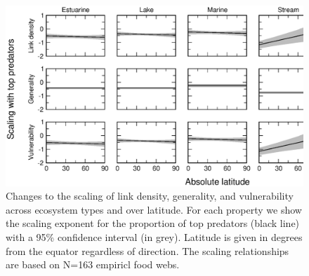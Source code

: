 \documentclass[12pt]{article}
\begin{document}
\begin{figure}[h]
\includegraphics[width=.85\textwidth]{Figures/by_TL/marginal/T_marginal_latitude_proportions.eps}
\caption{Changes to the scaling of link density, generality, and vulnerability across ecosystem
types and over latitude. For each property we show the scaling exponent for the proportion of
top predators (black line) with a 95\% confidence interval (in grey). Latitude is given in degrees
from the equator regardless of direction. The scaling relationships are based on N=163 empiricl food webs.}
\label{T}
\end{figure}
\end{document}
